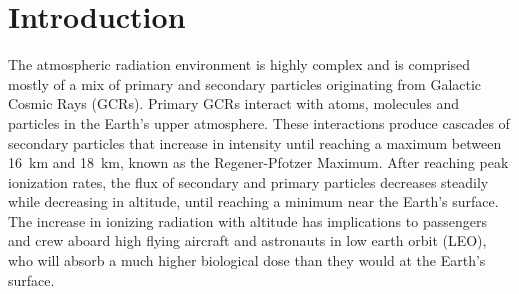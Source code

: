 \section{Introduction}
\label{Introduction}
The atmospheric radiation environment is highly complex and is comprised mostly of a mix of primary and secondary particles originating from Galactic Cosmic Rays (GCRs). Primary GCRs interact with atoms, molecules and particles in the Earth's upper atmosphere.  These interactions produce cascades of secondary particles that increase in intensity until reaching a maximum between \SI{16}{\km} and \SI{18}{\km}, known as the Regener-Pfotzer Maximum\cite{regener}. 
After reaching peak ionization rates, the flux of secondary and primary particles decreases steadily while decreasing in altitude, until reaching a minimum near the Earth's surface. 
%
The increase in ionizing radiation with altitude has implications to passengers and crew aboard high flying aircraft and astronauts in low earth orbit (LEO), who will absorb a much higher biological dose than they would at the Earth's surface. 

